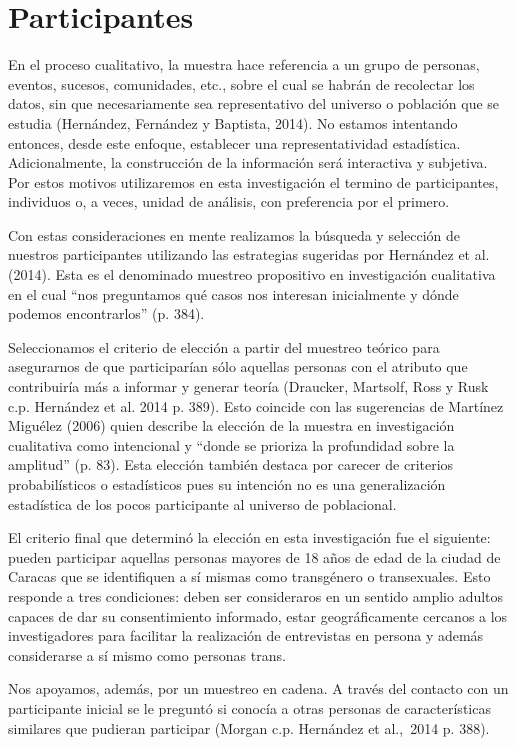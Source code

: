 \section{Participantes}
En el proceso cualitativo, la muestra hace referencia a un grupo de personas,
eventos, sucesos, comunidades, etc., sobre el cual se habrán de recolectar los
datos, sin que necesariamente sea representativo del universo o población que se
estudia (Hernández, Fernández y Baptista, 2014).
No estamos intentando entonces, desde este enfoque, establecer una
representatividad estadística.
Adicionalmente, la construcción de la información será interactiva y subjetiva.
Por estos motivos utilizaremos en esta investigación el termino de
participantes, individuos o, a veces, unidad de análisis, con preferencia por el
primero.

Con estas consideraciones en mente realizamos la búsqueda y selección de
nuestros participantes utilizando las estrategias sugeridas por Hernández et al.
(2014).
Esta es el denominado muestreo propositivo en investigación cualitativa en el
cual “nos preguntamos qué casos nos interesan inicialmente y dónde podemos
encontrarlos” (p. 384).

Seleccionamos el criterio de elección a partir del muestreo teórico para
asegurarnos de que participarían sólo aquellas personas con el atributo que
contribuiría más a informar y generar teoría (Draucker, Martsolf, Ross y Rusk
c.p. Hernández et al. 2014 p. 389).
Esto coincide con las sugerencias de Martínez Miguélez (2006) quien describe la
elección de la muestra en investigación cualitativa como intencional y “donde se
prioriza la profundidad sobre la amplitud” (p. 83).
Esta elección también destaca por carecer de criterios probabilísticos o
estadísticos pues su intención no es una generalización estadística de los pocos
participante al universo de poblacional.

El criterio final que determinó la elección en esta investigación fue el
siguiente: pueden participar aquellas personas mayores de 18 años de edad de la
ciudad de Caracas que se identifiquen a sí mismas como transgénero o
transexuales.
Esto responde a tres condiciones: deben ser consideraros en un sentido amplio
adultos capaces de dar su consentimiento informado, estar geográficamente
cercanos a los investigadores para facilitar la realización de entrevistas en
persona y además considerarse a sí mismo como personas trans.

Nos apoyamos, además, por un muestreo en cadena.
A través del contacto con un participante inicial se le preguntó si conocía a
otras personas de características similares que pudieran participar (Morgan c.p.
Hernández et  al.,\ 2014 p. 388).

